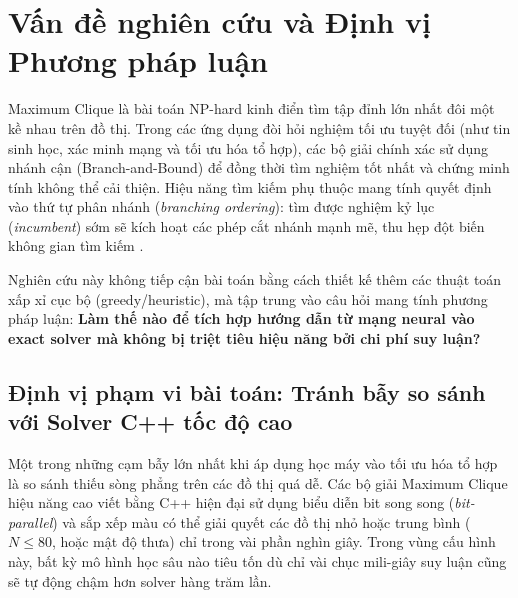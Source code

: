 \documentclass[11pt,a4paper]{article}
\begin{document}
\begin{abstract}
nhận chiến thắng bùng nổ trên \texttt{brock200\_3} khi cắt giảm hơn $52\%$ số nút tìm kiếm ($116,805 \to 56,004$ nút) và rút ngắn thời gian gần gấp đôi (+2.92s). Cần nhấn mạnh rằng mô hình COPT ở các mốc đầu thực chất là một đại diện zero-shot mượn tạm chưa từng được học cho động lực học cây tìm kiếm BnB; kết quả này mở ra tiềm năng to lớn để thay thế COPT bằng một mô hình chuyên dụng thế hệ mới bảo tồn quy giản Karp, kết hợp mô hình khuếch tán (Diffusion) và tối ưu hóa sở thích cây tìm kiếm (DPO) trong giai đoạn tiếp theo.
\end{abstract}


\section{Vấn đề nghiên cứu và Định vị Phương pháp luận}
Maximum Clique là bài toán NP-hard kinh điển tìm tập đỉnh lớn nhất đôi một kề nhau trên đồ thị. Trong các ứng dụng đòi hỏi nghiệm tối ưu tuyệt đối (như tin sinh học, xác minh mạng và tối ưu hóa tổ hợp), các bộ giải chính xác sử dụng nhánh cận (Branch-and-Bound) để đồng thời tìm nghiệm tốt nhất và chứng minh tính không thể cải thiện. Hiệu năng tìm kiếm phụ thuộc mang tính quyết định vào thứ tự phân nhánh (\textit{branching ordering}): tìm được nghiệm kỷ lục (\textit{incumbent}) sớm sẽ kích hoạt các phép cắt nhánh mạnh mẽ, thu hẹp đột biến không gian tìm kiếm \citep{prosser2012exact}.

Nghiên cứu này không tiếp cận bài toán bằng cách thiết kế thêm các thuật toán xấp xỉ cục bộ (greedy/heuristic), mà tập trung vào câu hỏi mang tính phương pháp luận: \textbf{Làm thế nào để tích hợp hướng dẫn từ mạng neural vào exact solver mà không bị triệt tiêu hiệu năng bởi chi phí suy luận?}

\subsection{Định vị phạm vi bài toán: Tránh bẫy so sánh với Solver C++ tốc độ cao}
Một trong những cạm bẫy lớn nhất khi áp dụng học máy vào tối ưu hóa tổ hợp là so sánh thiếu sòng phẳng trên các đồ thị quá dễ. Các bộ giải Maximum Clique hiệu năng cao viết bằng C++ hiện đại sử dụng biểu diễn bit song song (\textit{bit-parallel}) và sắp xếp màu \citep{sansegundo2011, li2018momc} có thể giải quyết các đồ thị nhỏ hoặc trung bình ($N \le 80$, hoặc mật độ thưa) chỉ trong vài phần nghìn giây. Trong vùng cấu hình này, bất kỳ mô hình học sâu nào tiêu tốn dù chỉ vài chục mili-giây suy luận cũng sẽ tự động chậm hơn solver hàng trăm lần.
\end{document}
